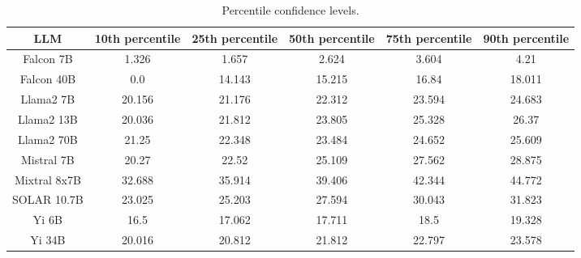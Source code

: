 \begin{table*}
\centering
\begin{tabular}{c|c|c|c|c|c}
LLM & 10th percentile & 25th percentile & 50th percentile & 75th percentile & 90th percentile\\ \hline
Falcon 7B & 1.326 & 1.657 & 2.624 & 3.604 & 4.21\\
Falcon 40B & 0.0 & 14.143 & 15.215 & 16.84 & 18.011\\
Llama2 7B & 20.156 & 21.176 & 22.312 & 23.594 & 24.683\\
Llama2 13B & 20.036 & 21.812 & 23.805 & 25.328 & 26.37\\
Llama2 70B & 21.25 & 22.348 & 23.484 & 24.652 & 25.609\\
Mistral 7B & 20.27 & 22.52 & 25.109 & 27.562 & 28.875\\
Mixtral 8x7B & 32.688 & 35.914 & 39.406 & 42.344 & 44.772\\
SOLAR 10.7B & 23.025 & 25.203 & 27.594 & 30.043 & 31.823\\
Yi 6B & 16.5 & 17.062 & 17.711 & 18.5 & 19.328\\
Yi 34B & 20.016 & 20.812 & 21.812 & 22.797 & 23.578\\
\hline
\end{tabular}
\caption{Percentile confidence levels.}
\label{tab:percentile_conf}
\end{table*}
